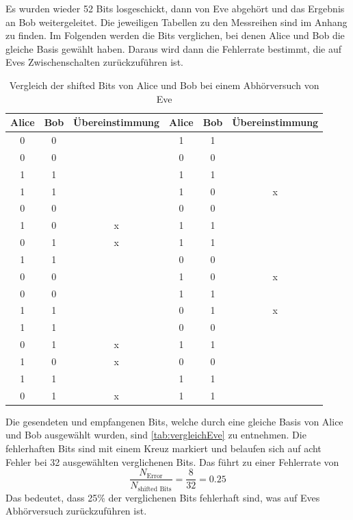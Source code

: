 \noindent Es wurden wieder 52 Bits losgeschickt, dann von Eve abgehört und das Ergebnis an Bob weitergeleitet. Die jeweiligen 
Tabellen zu den Messreihen sind im Anhang zu finden. Im Folgenden werden die Bits verglichen, bei denen Alice und Bob die gleiche 
Basis gewählt haben. Daraus wird dann die Fehlerrate bestimmt, die auf Eves Zwischenschalten zurückzuführen ist.
\begin{table}[H]
\centering
\begin{tabular}{c|c|c|c|c|c}
\textbf{Alice} &  \textbf{Bob} & Übereinstimmung &\textbf{Alice} &  \textbf{Bob} & Übereinstimmung \\ \hline
0 & 0 &  &1 & 1 &  \\
0 & 0 &  &0 & 0 &  \\
1 & 1 &  &1 & 1 &  \\
1 & 1 &  &1 & 0 & x \\
0 & 0 &  &0 & 0 &  \\
1 & 0 & x &1 & 1 &  \\
0 & 1 & x &1 & 1 &  \\
1 & 1 &  &0 & 0 &  \\
0 & 0 &  &1 & 0 & x \\
0 & 0 &  &1 & 1 &  \\
1 & 1 &  &0 & 1 & x\\
1 & 1 &  &0 & 0 &  \\
0 & 1 & x &1 & 1 &  \\
1 & 0 & x &0 & 0 &  \\
1 & 1 &  &1 & 1 &  \\
0 & 1 & x &1 & 1 &  \\
\hline
\end{tabular}
\caption{Vergleich der shifted Bits von Alice und Bob bei einem Abhörversuch von Eve}
\label{tab:vergleichEve}
\end{table}
\noindent Die gesendeten und empfangenen Bits, welche durch eine gleiche Basis von
Alice und Bob ausgewählt wurden, sind \autoref{tab:vergleichEve} zu entnehmen. Die
fehlerhaften Bits sind mit einem Kreuz markiert und belaufen sich auf acht Fehler
bei 32 ausgewählten verglichenen Bits. Das führt zu einer Fehlerrate von 
\begin{equation}
 \frac{N_\text{Error}}{N_\text{shifted Bits}} = \frac{8}{32} = 0.25 
\end{equation}
Das bedeutet, dass 25\% der verglichenen Bits fehlerhaft sind, was auf Eves Abhörversuch zurückzuführen ist.


